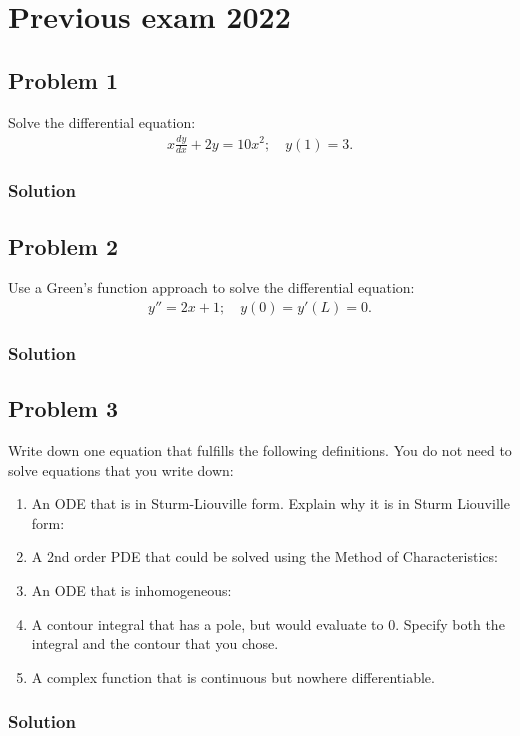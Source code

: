 \section{Previous exam 2022}

\subsection*{Problem 1}
Solve the differential equation:
\begin{align*}
    x\frac{dy}{dx} + 2y = 10x^2; \quad y(1) = 3.
\end{align*}

\subsubsection*{Solution}

\subsection*{Problem 2}
Use a Green's function approach to solve the differential equation:
\begin{align*}
    y'' = 2x + 1; \quad y(0) = y'(L) = 0.
\end{align*}
\subsubsection*{Solution}

\subsection*{Problem 3}
Write down one equation that fulfills the following definitions. You do not need to solve equations that you write down:
\begin{enumerate}
    \item An ODE that is in Sturm-Liouville form. Explain why it is in Sturm Liouville form:
    \item A 2nd order PDE that could be solved using the Method of Characteristics:
    \item An ODE that is inhomogeneous:
    \item A contour integral that has a pole, but would evaluate to 0. Specify both the integral and the contour that you chose.
    \item A complex function that is continuous but nowhere differentiable.    
\end{enumerate}

\subsubsection*{Solution}

